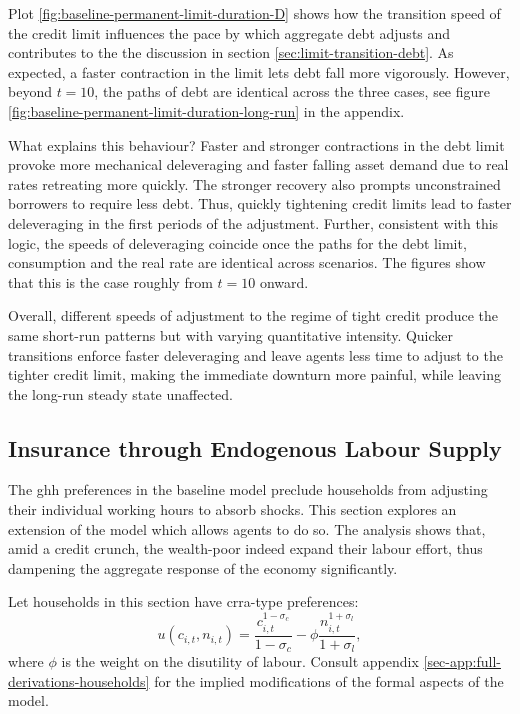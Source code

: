 \documentclass[a4paper,12pt]{article} %
\numberwithin{equation}{section} %
\numberwithin{figure}{section}
\numberwithin{table}{section}
\begin{document}
Plot \ref{fig:baseline-permanent-limit-duration-D} shows how the transition speed of the credit limit influences the pace by which aggregate debt adjusts and contributes to the the discussion in section \ref{sec:limit-transition-debt}. As expected, a faster contraction in the limit lets debt fall more vigorously. However, beyond $t=10$, the paths of debt are identical across the three cases, see figure \ref{fig:baseline-permanent-limit-duration-long-run} in the appendix. 

What explains this behaviour? Faster and stronger contractions in the debt limit provoke more mechanical deleveraging and faster falling asset demand due to real rates retreating more quickly. The stronger recovery also prompts unconstrained borrowers to require less debt. Thus, quickly tightening credit limits lead to faster deleveraging in the first periods of the adjustment. Further, consistent with this logic, the speeds of deleveraging coincide once the paths for the debt limit, consumption and the real rate are identical across scenarios. The figures show that this is the case roughly from $t=10$ onward.

Overall, different speeds of adjustment to the regime of tight credit produce the same short-run patterns but with varying quantitative intensity. Quicker transitions enforce faster deleveraging and leave agents less time to adjust to the tighter credit limit, making the immediate downturn more painful, while leaving the long-run steady state unaffected.

\subsection{Insurance through Endogenous Labour Supply}
\label{sec:sensitivity-end-labour}

The \Gls{ghh} preferences in the baseline model preclude households from adjusting their individual working hours to absorb shocks. This section explores an extension of the model which allows agents to do so. The analysis shows that, amid a credit crunch, the wealth-poor indeed expand their labour effort, thus dampening the aggregate response of the economy significantly.

Let households in this section have \Gls{crra}-type preferences:
\begin{equation}
    u(c_{i,t}, n_{i,t}) = \frac{c_{i,t}^{1-\sigma_c}}{1-\sigma_c} - \phi \frac{n_{i,t}^{1+\sigma_l}}{1+\sigma_l}, \label{eq:hh-crra-utility}
\end{equation}
where $\phi$ is the weight on the disutility of labour. Consult appendix \ref{sec-app:full-derivations-households} for the implied modifications of the formal aspects of the model. 
\end{document}
